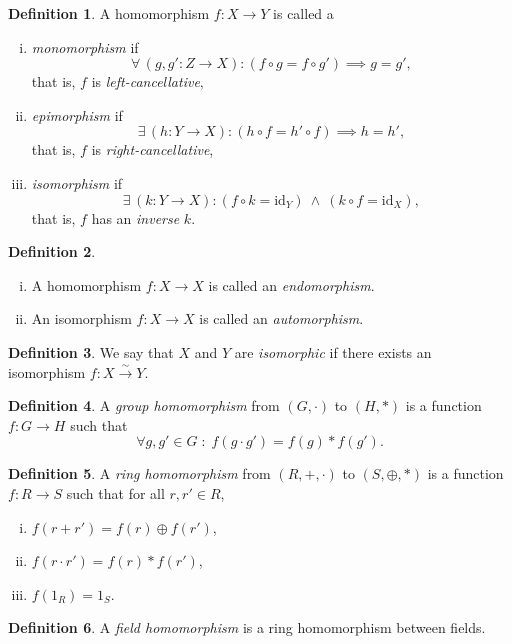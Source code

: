 \documentclass{article}
\theoremstyle{definition}
\newtheorem{definition}{Definition}
\newcommand{\id}{\mathrm{id}}
\begin{document}
\begin{definition}
	A homomorphism $f:X\to Y$ is called a
	\begin{enumerate}[i.]
		\item \emph{monomorphism} if
			\[
				\forall \,(g,g' : Z\to X) : (f\circ g = f\circ g') \implies g=g',
			\]
			that is, $f$ is \emph{left-cancellative},
		\item \emph{epimorphism} if
			\[
				\exists \,(h : Y\to X) : (h\circ f = h'\circ f) \implies h=h',
			\]
			that is, $f$ is \emph{right-cancellative},
		\item \emph{isomorphism} if
			\[
				\exists \,(k : Y\to X) : (f\circ k = \id_Y) \:\wedge\: (k\circ f=\id_X),
			\]
			that is, $f$ has an \emph{inverse} $k$.
	\end{enumerate}
\end{definition}

\begin{definition}
	\begin{enumerate}[i.]
		\item A homomorphism $f:X\to X$ is called an \emph{endomorphism}.
		\item An isomorphism $f:X\to X$ is called an \emph{automorphism}.
	\end{enumerate}
\end{definition}

\begin{definition}
	We say that $X$ and $Y$ are \emph{isomorphic} if there exists an isomorphism $f:X\xrightarrow{\sim}Y$.
\end{definition}

\begin{definition}
	A \emph{group homomorphism} from $(G,\cdot)$ to $(H,*)$ is a function $f:G\to H$ such that
	\[
		\forall g,g'\in G \;:\; f(g\cdot g') = f(g) * f(g').
	\]
\end{definition}

\begin{definition}
	A \emph{ring homomorphism} from $(R,+,\cdot)$ to $(S,\oplus,*)$ is a function $f:R\to S$ such that for all $r,r'\in R$,
	\begin{enumerate}[i.]
		\item $f(r+r')=f(r)\oplus f(r')$,
		\item $f(r\cdot r') = f(r)*f(r')$,
		\item $f(1_R)=1_S$.
	\end{enumerate}
\end{definition}

\begin{definition}
	A \emph{field homomorphism} is a ring homomorphism between fields.
\end{definition}
\end{document}
